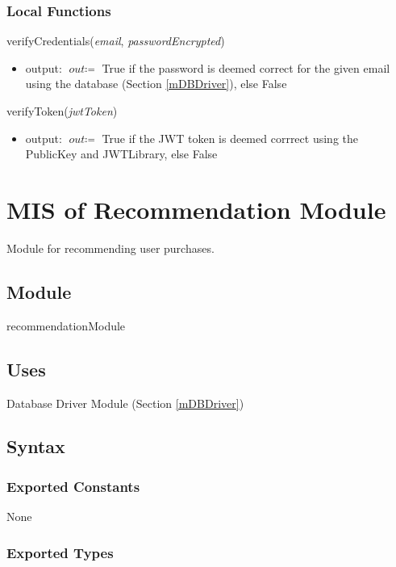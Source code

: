 \documentclass[12pt, titlepage]{article}
\begin{document}
\subsubsection{Local Functions}
verifyCredentials(\textit{email}, \textit{passwordEncrypted})
\begin{itemize}
\item output: \( \textit{out} \coloneqq \) True if the password is deemed correct for the given email using the database (Section \ref{mDBDriver}), else False
\end{itemize}

\noindent verifyToken(\textit{jwtToken})
\begin{itemize}
\item output: \( \textit{out} \coloneqq \) True if the JWT token is deemed corrrect using the PublicKey and JWTLibrary, else False
\end{itemize}

\newpage

\section{MIS of Recommendation Module} \label{mRecommendation}

Module for recommending user purchases.

\subsection{Module}

recommendationModule

\subsection{Uses}

Database Driver Module (Section \ref{mDBDriver})

\subsection{Syntax}

\subsubsection{Exported Constants}

None

\subsubsection{Exported Types}
\end{document}
